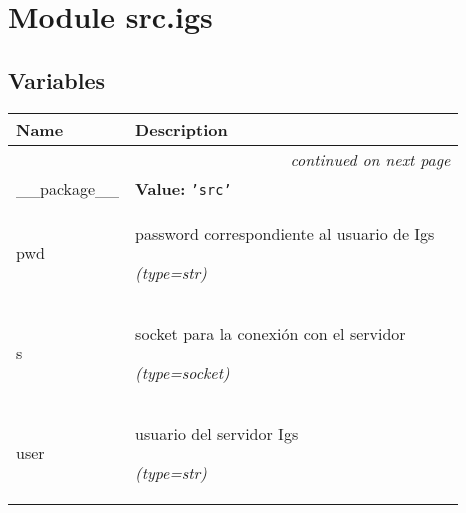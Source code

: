 %
%
%


\section{Module src.igs}

    \label{src:igs}


  \subsection{Variables}

    \vspace{-1cm}
\hspace{\varindent}\begin{longtable}{|p{\varnamewidth}|p{\vardescrwidth}|l}
\cline{1-2}
\cline{1-2} \centering \textbf{Name} & \centering \textbf{Description}& \\
\cline{1-2}
\endhead\cline{1-2}\multicolumn{3}{r}{\small\textit{continued on next page}}\\\endfoot\cline{1-2}
\endlastfoot\raggedright \_\-\_\-p\-a\-c\-k\-a\-g\-e\-\_\-\_\- & \raggedright \textbf{Value:} 
{\tt \texttt{'}\texttt{src}\texttt{'}}&\\
\cline{1-2}
\raggedright p\-w\-d\- & \raggedright password correspondiente al usuario de Igs

            {\it (type=str)}&\\
\cline{1-2}
\raggedright s\- & \raggedright socket para la conexión con el servidor

            {\it (type=socket)}&\\
\cline{1-2}
\raggedright u\-s\-e\-r\- & \raggedright usuario del servidor Igs

            {\it (type=str)}&\\
\cline{1-2}
\end{longtable}


